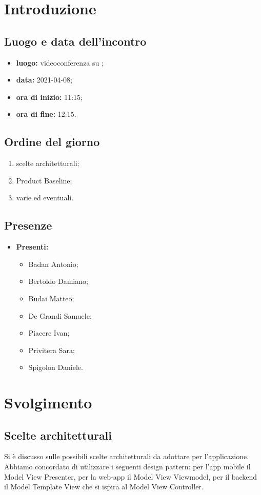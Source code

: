 \section*{Introduzione}
\subsection*{Luogo e data dell'incontro}
\begin{itemize}
	\item \textbf{luogo:} videoconferenza su ;
	\item \textbf{data:}  2021-04-08;
	\item \textbf{ora di inizio:} 11:15;
	\item \textbf{ora di fine:} 12:15.
\end{itemize}

\subsection*{Ordine del giorno}
\begin{enumerate}
	\item scelte architetturali;
	\item Product Baseline;
	\item varie ed eventuali.
\end{enumerate}

\subsection*{Presenze}
\begin{itemize}
	\item \textbf{Presenti:}
	\begin{itemize}
		\item Badan Antonio;
		\item Bertoldo Damiano;
		\item Budai Matteo;
		\item De Grandi Samuele;
		\item Piacere Ivan;
		\item Privitera Sara;
		\item Spigolon Daniele.
	\end{itemize}
\end{itemize}

\section*{Svolgimento}
\subsection*{Scelte architetturali}
Si è discusso sulle possibili scelte architetturali da adottare per l'applicazione. Abbiamo concordato di utilizzare i seguenti design pattern: per l'app mobile il Model View Presenter, per la web-app il Model View Viewmodel, per il backend il Model Template View che si ispira al Model View Controller.

